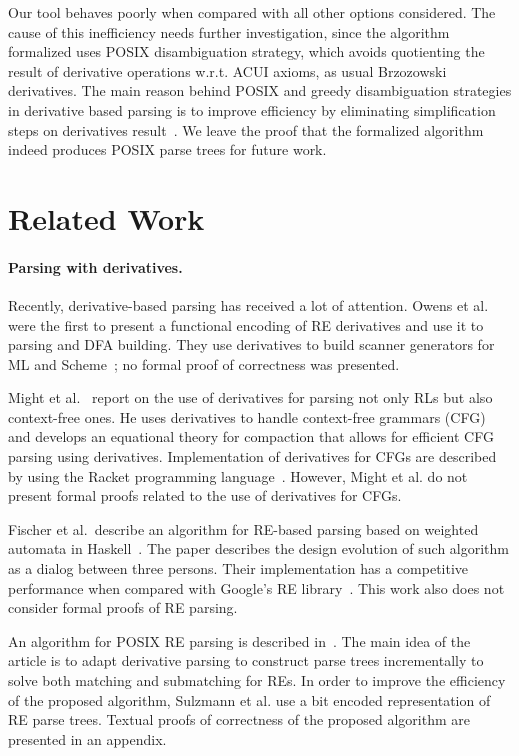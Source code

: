 \documentclass[sigconf]{acmart}
\theoremstyle{definition}
\begin{document}
Our tool behaves poorly when compared with all other options
considered. The cause of this inefficiency needs further
investigation, since the algorithm formalized uses POSIX 
disambiguation strategy, which avoids quotienting the result of derivative
operations w.r.t. ACUI axioms, as usual Brzozowski derivatives. 
The main reason behind POSIX and greedy disambiguation strategies in 
derivative based parsing is to improve efficiency by eliminating 
simplification steps on derivatives result~\cite{SulzmannL14}. We leave 
the proof that the formalized algorithm indeed produces POSIX parse trees 
for future work.

\section{Related Work}\label{sec:related}

\paragraph{Parsing with derivatives.} Recently, derivative-based
parsing has received a lot of attention. Owens et al. were the first
to present a functional encoding of RE derivatives and use it to
parsing and DFA building. They use derivatives to build scanner
generators for ML and Scheme~\cite{Owens2009}; no formal proof of
correctness was presented.

Might et al.~\cite{Might2011} report on
the use of derivatives for parsing not only RLs but also context-free
ones. He uses derivatives to handle context-free grammars (CFG) and
develops an equational theory for compaction that allows for efficient
CFG parsing using derivatives. Implementation of derivatives for CFGs
are described by using the Racket programming
language~\cite{Felleisen2013}. However, Might et al. do not present
formal proofs related to the use of derivatives for CFGs.

Fischer et al.~describe an algorithm for RE-based parsing based on
weighted automata in Haskell~\cite{Fischer2010}.  The paper describes
the design evolution of such algorithm as a dialog between three
persons. Their implementation has a competitive performance when
compared with Google's RE library~\cite{re2}. This work also does not
consider formal proofs of RE parsing.

An algorithm for POSIX RE parsing is described
in~\cite{SulzmannL14}. The main idea of the article is to adapt
derivative parsing to construct parse trees incrementally to solve
both matching and submatching for REs. In order to improve the
efficiency of the proposed algorithm, Sulzmann et al. use a bit
encoded representation of RE parse trees. Textual proofs of
correctness of the proposed algorithm are presented in an appendix.
\end{document}

